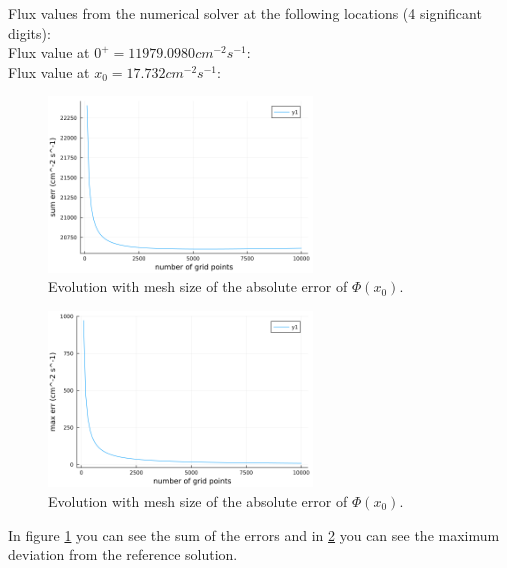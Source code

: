 \documentclass[11pt,a4paper]{article}
\begin{document}
Flux values from the numerical solver at the following locations (4 significant digits):\\
Flux value at $0^+ = 11979.0980 cm^{-2} s^{-1}$: \\
Flux value at $x_0 = 17.732 cm^{-2} s^{-1}$: \\


\begin{figure}[h]
\includegraphics[width=7cm]{../figs/sum_errors.png}
\centering
\caption{Evolution with mesh size of the absolute error of $\Phi(x_0)$.}
\label{sumerr}
\end{figure}
\begin{figure}[h]
\includegraphics[width=7cm]{../figs/max_errors.png}
\centering
\caption{Evolution with mesh size of the absolute error of $\Phi(x_0)$.}
\label{maxerr}
\end{figure}

In figure \ref{sumerr} you can see the sum of the errors and in \ref{maxerr} you can see the maximum deviation from the reference solution.


\end{document}

